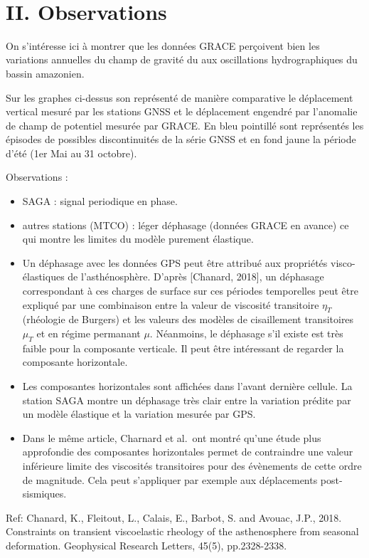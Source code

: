 \documentclass[11pt]{article}
\providecommand{\tightlist}{%
      \setlength{\itemsep}{0pt}\setlength{\parskip}{0pt}}
\begin{document}
    \begin{center}
    \end{center}
    { \hspace*{\fill} \\}
    
    \hypertarget{ii.-observations}{%
\section{II. Observations}\label{ii.-observations}}

On s'intéresse ici à montrer que les données GRACE perçoivent bien les
variations annuelles du champ de gravité du aux oscillations
hydrographiques du bassin amazonien.

Sur les graphes ci-dessus son représenté de manière comparative le
déplacement vertical mesuré par les stations GNSS et le déplacement
engendré par l'anomalie de champ de potentiel mesurée par GRACE. En bleu
pointillé sont représentés les épisodes de possibles discontinuités de
la série GNSS et en fond jaune la période d'été (1er Mai au 31 octobre).

Observations :

    \begin{itemize}
\tightlist
\item
  SAGA : signal periodique en phase.
\item
  autres stations (MTCO) : léger déphasage (données GRACE en avance) ce
  qui montre les limites du modèle purement élastique.
\item
  Un déphasage avec les données GPS peut être attribué aux propriétés
  visco-élastiques de l'asthénosphère. D'après {[}Chanard, 2018{]}, un
  déphasage correspondant à ces charges de surface sur ces périodes
  temporelles peut être expliqué par une combinaison entre la valeur de
  viscosité transitoire \(\eta_T\) (rhéologie de Burgers) et les valeurs
  des modèles de cisaillement transitoires \(\mu_T\) et en régime
  permanant \(\mu\). Néanmoins, le déphasage s'il existe est très faible
  pour la composante verticale. Il peut être intéressant de regarder la
  composante horizontale.
\item
  Les composantes horizontales sont affichées dans l'avant dernière
  cellule. La station SAGA montre un déphasage très clair entre la
  variation prédite par un modèle élastique et la variation mesurée par
  GPS.
\item
  Dans le même article, Charnard et al.~ont montré qu'une étude plus
  approfondie des composantes horizontales permet de contraindre une
  valeur inférieure limite des viscosités transitoires pour des
  évènements de cette ordre de magnitude. Cela peut s'appliquer par
  exemple aux déplacements post-sismiques.
\end{itemize}

    Ref: Chanard, K., Fleitout, L., Calais, E., Barbot, S. and Avouac, J.P.,
2018. Constraints on transient viscoelastic rheology of the
asthenosphere from seasonal deformation. Geophysical Research Letters,
45(5), pp.2328-2338.


    
    
    
\end{document}
